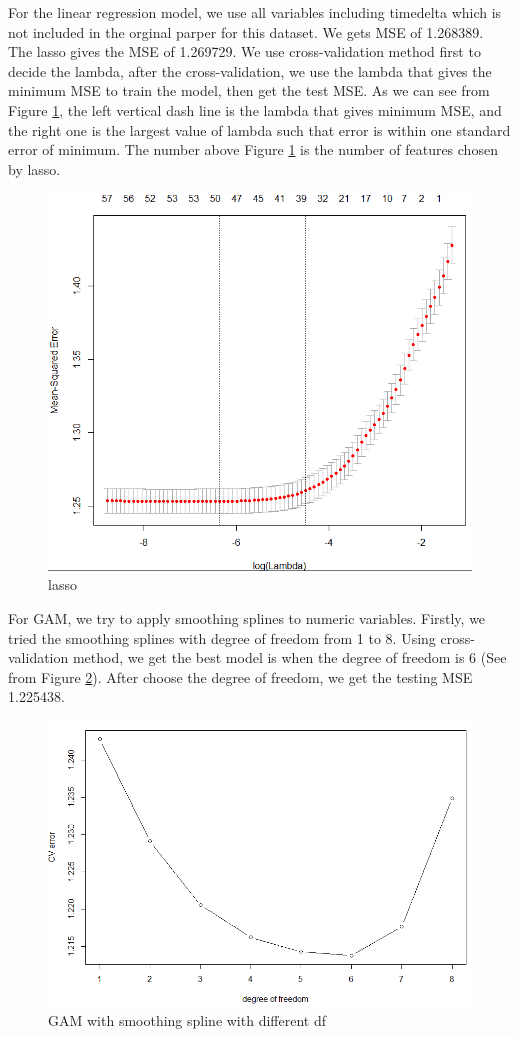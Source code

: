 \documentclass[11pt]{article}
\begin{document}
For the linear regression model, we use all variables including timedelta which is not included in the orginal parper for this dataset. We gets MSE of 1.268389. \\

The lasso gives the MSE of 1.269729. We use cross-validation method first to decide the lambda, after the cross-validation, we use the lambda that gives the minimum MSE to train the model, then get the test MSE. As we can see from Figure \ref{fig:lasso}, the left vertical dash line is the lambda that gives minimum MSE, and the right one is the largest value of lambda such that error is within one standard error of minimum. The number above Figure \ref{fig:lasso} is the number of features chosen by lasso. \\

    \begin{figure}[h]
        \centering
        \includegraphics[width=0.7\linewidth]{lasso_plot.png}
        \caption{lasso}
        \label{fig:lasso}
    \end{figure}
    
For GAM, we try to apply smoothing splines to numeric variables. Firstly, we tried the smoothing splines with degree of freedom from 1 to 8. Using cross-validation method, we get the best model is when the degree of freedom is 6 (See from Figure \ref{fig:gam}). After choose the degree of freedom, we get the testing MSE 1.225438. \\ 

    \begin{figure}[h]
        \centering
        \includegraphics[width=0.7\linewidth]{gam_plot.png}
        \caption{GAM with smoothing spline with different df}
        \label{fig:gam}
    \end{figure}
\end{document}
